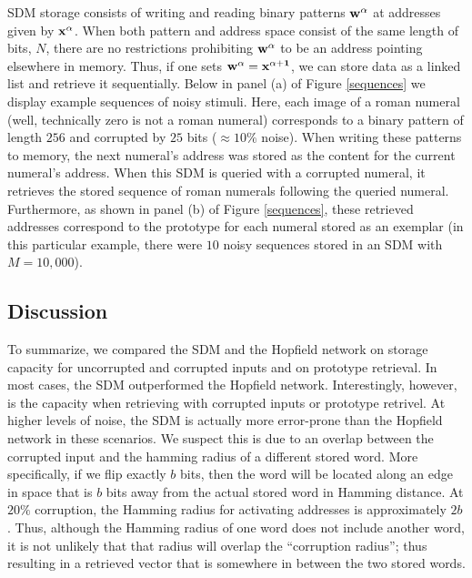 \documentclass[10pt,letterpaper]{article}
\begin{document}
SDM storage consists of writing and reading binary patterns $\bf{w}^{\alpha}$ at addresses given by $\bf{x}^{\alpha}$. When both pattern and address space consist of the same length of bits, $N$, there are no restrictions prohibiting $\bf{w}^{\alpha}$ to be an address pointing elsewhere in memory. Thus, if one sets $\bf{w}^{\alpha} = \bf{x}^{\alpha+1}$, we can store data as a linked list and retrieve it sequentially. Below in panel (a) of Figure \ref{sequences} we display example sequences of noisy stimuli. Here, each image of a roman numeral (well, technically zero is not a roman numeral) corresponds to a binary pattern of length $256$ and corrupted by $25$ bits ($\approx 10\%$ noise). When writing these patterns to memory, the next numeral's address was stored as the content for the current numeral's address. When this SDM is queried with a corrupted numeral, it retrieves the stored sequence of roman numerals following the queried numeral. Furthermore, as shown in panel (b) of Figure \ref{sequences}, these retrieved addresses correspond to the prototype for each numeral stored as an exemplar (in this particular example, there were $10$ noisy sequences stored in an SDM with $M=10,000$).




\subsection{Discussion}

To summarize, we compared the SDM and the Hopfield network on storage
capacity for uncorrupted and corrupted inputs and on prototype
retrieval. In most cases, the SDM outperformed the Hopfield
network. Interestingly, however, is the capacity when retrieving with
corrupted inputs or prototype retrivel. At higher levels of noise, the
SDM is actually more error-prone than the Hopfield network in these
scenarios. We suspect this is due to an overlap between the corrupted
input and the hamming radius of a different stored word. More
specifically, if we flip exactly $b$ bits, then the word will be
located along an edge in space that is $b$ bits away from the actual
stored word in Hamming distance. At $20\%$ corruption, the Hamming
radius for activating addresses is approximately $2b$. Thus, although
the Hamming radius of one word does not include another word, it is
not unlikely that that radius will overlap the ``corruption radius'';
thus resulting in a retrieved vector that is somewhere in between the
two stored words.
\end{document}

